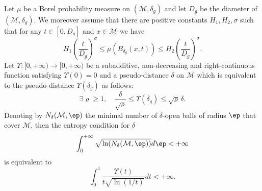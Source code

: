 \begin{prop}\label{lem-ref}
Let $\mu$ be a Borel probability measure on $(\mathcal{M},\delta_g)$ and let $D_g$ be the diameter of $(\mathcal{M},\delta_g)$. We moreover assume that there are positive constants $H_1,H_2,\sigma$ such that for any $t\in [0,D_g]$ and $x\in \mathcal{M}$ we have\vspace*{-3pt}
\begin{equation}\label{ln-hom}
H_1 \left(\frac{t}{D_g}\right)^{\sigma} \leq \mu (B_{\delta_g}(x,t)) \leq H_2 \left(\frac{t}{D_g}\right)^{\sigma}.
\end{equation}
Let $\Upsilon: [0,+\infty)\to [0,+\infty)$ be a subadditive, non-decreasing and right-continuous function satisfying $\Upsilon(0)=0$ and a pseudo-distance $\delta$ on $\mathcal{M}$ which is equivalent to the pseudo-distance $\Upsilon(\delta_g)$ as follows:\vspace*{-3pt}
\begin{equation}\label{equi}
\exists \varrho\geq 1, \quad \frac{\delta}{\sqrt{\varrho}}\leq \Upsilon(\delta_g)\leq \sqrt{\varrho}\, \delta.
\end{equation}
Denoting by $N_\delta(\mathcal{M},\ep)$ the minimal number of $\delta$-open balls of radius $\ep$ that cover $\mathcal{M}$, then the entropy condition for $\delta$\vspace*{-3pt}
\begin{equation}\label{lem-ent}
\int_{0}^{+\infty} \sqrt{\ln(N_\delta(\mathcal{M},\ep))}d\ep<+\infty
\end{equation}
is equivalent to\vspace*{-3pt}
\begin{equation*}
\int_{0}^{1} \frac{\Upsilon(t)}{t \sqrt{\ln(1/t)}}dt <+\infty.
\end{equation*}
\end{prop}


